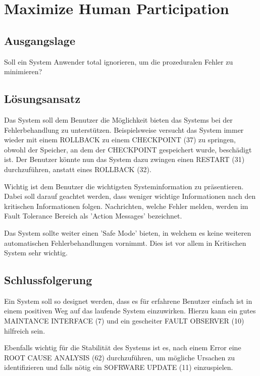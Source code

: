 \section{Maximize Human Participation}

\subsection{Ausgangslage}

Soll ein System Anwender total ignorieren, um die prozeduralen Fehler zu minimieren?

\subsection{Lösungsansatz}

Das System soll dem Benutzer die Möglichkeit bieten das Systems bei der Fehlerbehandlung zu unterstützen. Beispielsweise versucht das System immer wieder mit einem ROLLBACK zu einem CHECKPOINT (37) zu springen, obwohl der Speicher, an dem der CHECKPOINT gespeichert wurde, beschädigt ist. Der Benutzer könnte nun das System dazu zwingen einen RESTART (31) durchzuführen, anstatt eines ROLLBACK (32).

Wichtig ist dem Benutzer die wichtigsten Systeminformation zu präsentieren. Dabei soll darauf geachtet werden, dass weniger wichtige Informationen nach den kritischen Informationen folgen. Nachrichten, welche Fehler melden, werden im Fault Tolerance Bereich als 'Action Messages' bezeichnet.

Das System sollte weiter einen 'Safe Mode' bieten, in welchem es keine weiteren automatischen Fehlerbehandlungen vornimmt. Dies ist vor allem in Kritischen System sehr wichtig.

\subsection{Schlussfolgerung}

Ein System soll so designet werden, dass es für erfahrene Benutzer einfach ist in einem positiven Weg auf das laufende System einzuwirken. Hierzu kann ein gutes MAINTANCE INTERFACE (7) und ein gescheiter FAULT OBSERVER (10) hilfreich sein.

Ebenfalls wichtig für die Stabilität des Systems ist es, nach einem Error eine ROOT CAUSE ANALYSIS (62) durchzuführen, um mögliche Ursachen zu identifizieren und falls nötig ein SOFRWARE UPDATE (11) einzuspielen.

